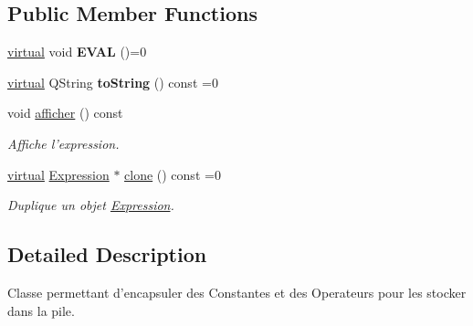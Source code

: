 \subsection*{\-Public \-Member \-Functions}
\begin{DoxyCompactItemize}
\item 
\hypertarget{class_l_o21_1_1_expression_a2bfd638d2010da1b60247130d24fcc13}{\hyperlink{classvirtual}{virtual} void {\bfseries \-E\-V\-A\-L} ()=0}\label{class_l_o21_1_1_expression_a2bfd638d2010da1b60247130d24fcc13}

\item 
\hypertarget{class_l_o21_1_1_expression_a067fc40ca2eb668f80420b129721b1cd}{\hyperlink{classvirtual}{virtual} \-Q\-String {\bfseries to\-String} () const =0}\label{class_l_o21_1_1_expression_a067fc40ca2eb668f80420b129721b1cd}

\item 
\hypertarget{class_l_o21_1_1_expression_ad6501101ddf87edea596d23aa85b1682}{void \hyperlink{class_l_o21_1_1_expression_ad6501101ddf87edea596d23aa85b1682}{afficher} () const }\label{class_l_o21_1_1_expression_ad6501101ddf87edea596d23aa85b1682}

\begin{DoxyCompactList}\small\item\em \-Affiche l'expression. \end{DoxyCompactList}\item 
\hyperlink{classvirtual}{virtual} \hyperlink{class_l_o21_1_1_expression}{\-Expression} $\ast$ \hyperlink{class_l_o21_1_1_expression_ad2c9e5301c976f9a2d40edaff0332715}{clone} () const =0
\begin{DoxyCompactList}\small\item\em \-Duplique un objet \hyperlink{class_l_o21_1_1_expression}{\-Expression}. \end{DoxyCompactList}\end{DoxyCompactItemize}


\subsection{\-Detailed \-Description}
\-Classe permettant d'encapsuler des \-Constantes et des \-Operateurs pour les stocker dans la pile. 

